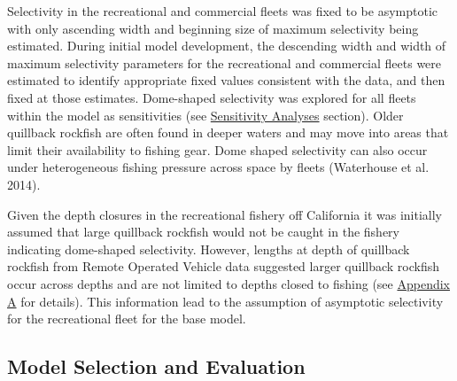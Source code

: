 \documentclass[11pt,
  english,
  a4paper,
]{article}
\begin{document}
\leavevmode\tagmcend\tagstructend\par


Selectivity in the recreational and commercial fleets was fixed to be asymptotic with only ascending width and beginning size of maximum selectivity being estimated. During initial model development, the descending width and width of maximum selectivity parameters for the recreational and commercial fleets were estimated to identify appropriate fixed values consistent with the data, and then fixed at those estimates. Dome-shaped selectivity was explored for all fleets within the model as sensitivities (see {\protect\hyperlink{sensitivity-analyses}{Sensitivity Analyses}\leavevmode\tagmcend\tagstructend} section). Older quillback rockfish are often found in deeper waters and may move into areas that limit their availability to fishing gear. Dome shaped selectivity can also occur under heterogeneous fishing pressure across space by fleets {(Waterhouse et al. 2014)\leavevmode\tagmcend\tagstructend}.

\leavevmode\tagmcend\tagstructend\par


Given the depth closures in the recreational fishery off California it was initially assumed that large quillback rockfish would not be caught in the fishery indicating dome-shaped selectivity. However, lengths at depth of quillback rockfish from Remote Operated Vehicle data suggested larger quillback rockfish occur across depths and are not limited to depths closed to fishing (see {\protect\hyperlink{append_a}{Appendix A}\leavevmode\tagmcend\tagstructend} for details). This information lead to the assumption of asymptotic selectivity for the recreational fleet for the base model.

\leavevmode\tagmcend\tagstructend\par


\hypertarget{model-selection-and-evaluation}{%
\subsection{Model Selection and Evaluation}\label{model-selection-and-evaluation}}
\end{document}
